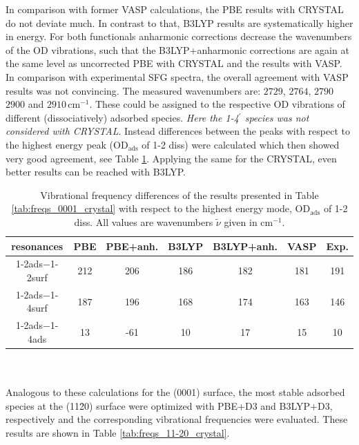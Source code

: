 \documentclass[11pt,DIV=13,BCOR=5mm,a4paper,headinclude]{scrbook}
\begin{document}
In comparison with former VASP calculations, the PBE results with CRYSTAL do not deviate much.
In contrast to that, B3LYP results are systematically higher in energy.
For both functionals anharmonic corrections decrease the wavenumbers of the OD vibrations, such that the B3LYP+anharmonic corrections are again at the same level as uncorrected PBE with CRYSTAL and the results with VASP.
In comparison with experimental SFG spectra\cite{Wirth2014}, the overall agreement with VASP results was not convincing.
The measured wavenumbers are: $2729$, $2764$, $2790$ $2900$ and $2910\,$cm$^{-1}$.
These could be assigned to the respective OD vibrations of different (dissociatively) adsorbed species.
\textit{Here the 1-4$^\prime$ species was not considered with CRYSTAL}.
Instead differences between the peaks with respect to the highest energy peak (OD$_\textrm{ads}$ of 1-2 diss) were calculated which then showed very good agreement, see Table \ref{tab:freqs_0001_crystal-relative}.
Applying the same for the CRYSTAL, even better results can be reached with B3LYP.
\begin{table}[!h]
  \centering
  \caption{Vibrational frequency differences of the results presented in Table \ref{tab:freqs_0001_crystal} with respect to the highest energy mode, OD$_\textrm{ads}$ of 1-2 diss.
All values are wavenumbers $\tilde{\nu}$ given in cm$^{-1}$.}
  \begin{tabular}{c|cc|cc|c|c}
  \toprule
   resonances& PBE & PBE+anh. & B3LYP & B3LYP+anh. &VASP&Exp.\\\midrule
  1-2ads$-$1-2surf&212 &206 &186 &182 &181 &191 \\
  1-2ads$-$1-4surf&187 &196 &168 &174 &163 &146 \\
  1-2ads$-$1-4ads &13 &-61 &10 &17 &15 &10 \\\bottomrule
    \end{tabular}
  \label{tab:freqs_0001_crystal-relative}
\end{table}
\\\\
Analogous to these calculations for the (0001) surface, the most stable adsorbed species at the (11\=20) surface were optimized with PBE+D3 and B3LYP+D3, respectively and the corresponding vibrational frequencies were evaluated.
These results are shown in Table \ref{tab:freqs_11-20_crystal}.
\end{document}
